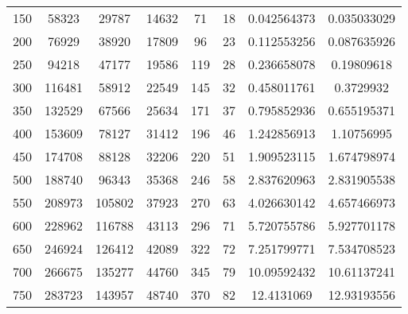 \documentclass[conference]{acmsiggraph}
\begin{document}
\begin{table}[b]
{{\begin{minipage}{\textwidth}
\begin{tabular}{cccccccc}
    150                  & 58323              & 29787           & 14632         & 71                & 18              & 0.042564373               & 0.035033029             \\
    200                  & 76929              & 38920           & 17809         & 96                & 23              & 0.112553256               & 0.087635926             \\
    250                  & 94218              & 47177           & 19586         & 119               & 28              & 0.236658078               & 0.19809618              \\
    300                  & 116481             & 58912           & 22549         & 145               & 32              & 0.458011761               & 0.3729932               \\
    350                  & 132529             & 67566           & 25634         & 171               & 37              & 0.795852936               & 0.655195371             \\
    400                  & 153609             & 78127           & 31412         & 196               & 46              & 1.242856913               & 1.10756995              \\
    450                  & 174708             & 88128           & 32206         & 220               & 51              & 1.909523115               & 1.674798974             \\
    500                  & 188740             & 96343           & 35368         & 246               & 58              & 2.837620963               & 2.831905538             \\
    550                  & 208973             & 105802          & 37923         & 270               & 63              & 4.026630142               & 4.657466973             \\
    600                  & 228962             & 116788          & 43113         & 296               & 71              & 5.720755786               & 5.927701178             \\
    650                  & 246924             & 126412          & 42089         & 322               & 72              & 7.251799771               & 7.534708523             \\
    700                  & 266675             & 135277          & 44760         & 345               & 79              & 10.09592432               & 10.61137241             \\
    750                  & 283723             & 143957          & 48740         & 370               & 82              & 12.4131069                & 12.93193556             \\

\end{tabular}
\end{minipage}}}
\end{table}
\end{document}
